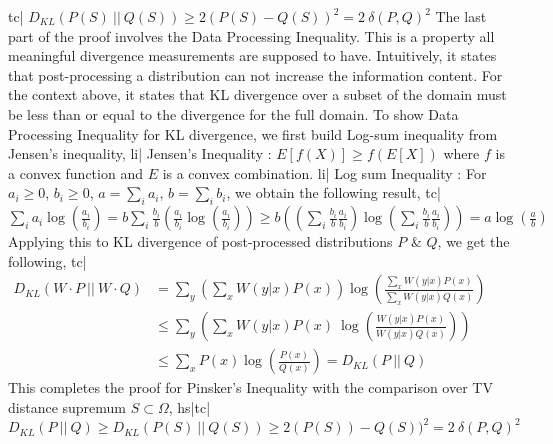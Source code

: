 tc| \( D_{KL}(P(S) \ || \ Q(S)) \ge 2(P(S)-Q(S))^2 = 2 \ \delta(P,Q)^2 \)
The last part of the proof involves the Data Processing Inequality. This is a property all meaningful divergence measurements are supposed to have. Intuitively, it states that post-processing a distribution can not increase the information content. For the context above, it states that KL divergence over a subset of the domain must be less than or equal to the divergence for the full domain.
To show Data Processing Inequality for KL divergence, we first build Log-sum inequality from Jensen's inequality,
li| Jensen's Inequality : \( E[f(X)] \ge f(E[X]) \) where \(f\) is a convex function and \(E\) is a convex combination.
li| Log sum Inequality : For \(a_i \ge 0\), \(b_i \ge 0\), \(a = \sum_i a_i\), \(b = \sum_i b_i\), we obtain the following result,
tc| \( \sum_i a_i \log \left( \frac{a_i}{b_i} \right) = b \sum_i \frac{b_i}{b} \left( \frac{a_i}{b_i} \log \left( \frac{a_i}{b_i} \right) \right) \ge b \left( \left( \sum_i \frac{b_i}{b} \frac{a_i}{b_i} \right) \log \left( \sum_i \frac{b_i}{b} \frac{a_i}{b_i} \right) \right) = a \log \left( \frac{a}{b} \right) \)
Applying this to KL divergence of post-processed distributions \(P\) & \(Q\), we get the following,
tc| \( \begin{align} D_{KL}(W \cdot P \ || \ W \cdot Q) & = \sum_y \left(\sum_x W(y|x) P(x) \right) \log \left( \frac{ \sum_x W(y|x) P(x) }{ \sum_x W(y|x) Q(x) } \right) \\ & \le \sum_y \left( \sum_x W(y|x) P(x) \ \log \left( \frac{ W(y|x) P(x) }{ W(y|x) Q(x) } \right) \right) \\ & \le \sum_x P(x) \log \left( \frac{P(x)}{Q(x)} \right) = D_{KL}(P \ || \ Q) \end{align} \)
This completes the proof for Pinsker's Inequality with the comparison over TV distance supremum \(S \subset \Omega\),
hs|tc| \( D_{KL}(P \ || \ Q) \ge D_{KL}( P(S) \ || \ Q(S)) \ge 2(P(S)) - Q(S))^2 = 2 \ \delta(P, Q)^2 \)